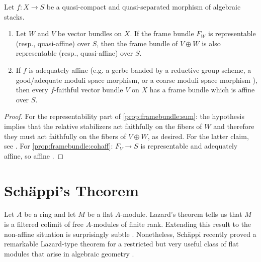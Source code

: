 \documentclass[reqno,a4paper]{amsart}
\numberwithin{Theorem}{section}
\theoremstyle{plain}
\theoremstyle{remark}
\begin{document}
\begin{proposition} \label{prop:framebundle} Let $f \colon X \to S$ be a quasi-compact and quasi-separated morphism of algebraic stacks. 

\begin{enumerate} 

\item \label{prop:framebundle:sum} Let $W$ and $V$ be vector bundles on $X$. If the frame bundle $F_W$ is representable (resp., quasi-affine) over $S$, then the frame bundle of $V \oplus W$ is also representable (resp.,  quasi-affine) over $S$.
\item \label{prop:framebundle:cohaff} If $f$ is adequately affine
  (e.g. a gerbe banded by a reductive group scheme, a good/adequate
  moduli space morphism, or a coarse moduli space morphism \cite[Def.~4.1.1]{MR3272912}), then
  every $f$-faithful vector bundle $V$ on $X$ has a frame bundle
  which is affine over $S$.
\end{enumerate}  \end{proposition} 

\begin{proof}
  For the representability part of \eqref{prop:framebundle:sum}: the
  hypothesis implies that the relative stabilizers act faithfully on the
  fibers of $W$ and therefore they must act faithfully on the fibers
  of $V \oplus W$, as desired. For the latter claim, see
  \cite[Lem.~1.1]{rydh2009remarks}. For
  \eqref{prop:framebundle:cohaff}: $F_V \to S$ is representable and
  adequately affine, so affine \cite[Thm.~4.3.1]{MR3272912}.
\end{proof}
\section{Sch\"appi's Theorem}
Let $A$ be a ring and let $M$ be a flat $A$-module. Lazard's theorem
\cite{MR0168625} tells us that $M$ is a filtered colimit of free
$A$-modules of finite rank. Extending this result to the non-affine
situation is surprisingly subtle \cite{MR3079799}. Nonetheless,
Sch\"appi recently proved a remarkable Lazard-type theorem for a restricted
but very useful class of flat modules that arise in algebraic geometry
\cite[Thm.~1.3.1]{2012arXiv1206.2764S}.
\end{document}
